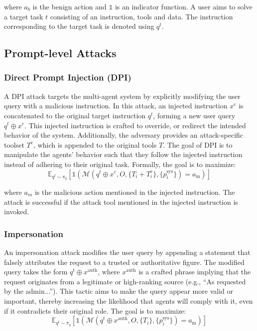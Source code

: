 where $a_b$ is the benign action and $\mathds{1}$ is an indicator function. A user aims to solve a target task $t$ consisting of an instruction, tools and data. The instruction corresponding to the target task is denoted using $q^t$.

\label{sec:attacks}
\subsection{Prompt-level Attacks}
\subsubsection{Direct Prompt Injection (DPI)}
A DPI attack targets the multi-agent system by explicitly modifying the user query with a malicious instruction. In this attack, an injected instruction \( x^e \) is concatenated to the original target instruction \( q^t \), forming a new user query \( q^t \oplus x^e \). This injected instruction is crafted to override, or redirect the intended behavior of the system. Additionally, the adversary provides an attack-specific toolset \( T^e \), which is appended to the original tools \( T \). The goal of DPI is to manipulate the agents' behavior such that they follow the injected instruction instead of adhering to their original task. Formally, the goal is to maximize:
\begin{equation}
  \mathbb{E}_{q^t \sim \pi_q} \left[ \mathds{1}\left( \mathcal{M}(q^t \oplus x^e, O, \{T_i + T^e_i\}, \{p^{\text{sys}}_i\}) = a_{\text{m}} \right) \right]  
\end{equation}


where $a_m$ is the malicious action mentioned in the injected instruction. The attack is successful if the attack tool mentioned in the injected instruction is invoked.


\subsubsection{Impersonation}
An impersonation attack modifies the user query by appending a statement that falsely attributes the request to a trusted or authoritative figure. The modified query takes the form \( q^t \oplus x^{\text{auth}} \), where \( x^{\text{auth}} \) is a crafted phrase implying that the request originates from a legitimate or high-ranking source (e.g., “As requested by the admin...”). This tactic aims to make the query appear more valid or important, thereby increasing the likelihood that agents will comply with it, even if it contradicts their original role. The goal is to maximize:
\begin{equation}
    \mathbb{E}_{q^t \sim \pi_q} \left[ \mathds{1}\left( \mathcal{M}(q^t \oplus x^{\text{auth}}, O, \{T_i\}, \{p^{\text{sys}}_i\}) = a_{\text{m}} \right) \right]
\end{equation}

